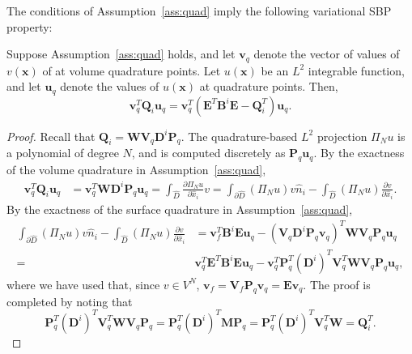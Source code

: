 \documentclass{svjour3}                     %
\renewcommand{\hat}{\widehat}
\newcommand{\pd}[2]{\frac{\partial#1}{\partial#2}}
\newcommand{\LRp}[1]{\left( #1 \right)}
\begin{document}

The conditions of Assumption~\ref{ass:quad} imply the following variational SBP property:
\begin{lemma}
\label{lemma:vsbp}
Suppose Assumption~\ref{ass:quad} holds, and let $\bm{v}_q$ denote the vector of values of $v(\bm{x})$ of at volume quadrature points. Let $u(\bm{x})$ be an $L^2$ integrable function, and let $\bm{u}_q$ denote the values of $u(\bm{x})$ at quadrature points.  Then, 
\[
\bm{v}_q^T\bm{Q}_i \bm{u}_q = \bm{v}_q^T\LRp{ {\bm{E}}^T \bm{B}^i\bm{E} - \bm{Q}_i^T}\bm{u}_q.
\]
\end{lemma}
\begin{proof}
Recall that $\bm{Q}_i = \bm{W} \bm{V}_q \bm{D}^i\bm{P}_q$.  The quadrature-based $L^2$ projection $\Pi_Nu$ is a polynomial of degree $N$, and is computed discretely as $\bm{P}_q\bm{u}_q$.  By the exactness of the volume quadrature in Assumption~\ref{ass:quad}, 
\begin{align*}
\bm{v}_q^T\bm{Q}_i \bm{u}_q &= \bm{v}_q^T\bm{W} \bm{D}^i \bm{P}_q \bm{u}_q = \int_{\hat{D}} \pd{\Pi_N u}{\hat{x}_i} v = \int_{\partial \hat{D}} (\Pi_N u) v \hat{n}_i - \int_{\hat{D}} \LRp{\Pi_N u} \pd{v}{\hat{x}_i}.
\end{align*}
By the exactness of the surface quadrature in Assumption~\ref{ass:quad}, 
\begin{align*}
\int_{\partial \hat{D}} (\Pi_N u) v \hat{n}_i -   \int_{\hat{D}} \LRp{\Pi_N u} \pd{v}{\hat{x}_i} &=\bm{v}_f^T\bm{B}^i \bm{E}\bm{u}_q - \LRp{\bm{V}_q\bm{D}^i\bm{P}_q\bm{v}_q}^T\bm{W} \bm{V}_q\bm{P}_q\bm{u}_q\\
=& \bm{v}_q^T {\bm{E}}^T\bm{B}^i \bm{E}\bm{u}_q - \bm{v}_q^T \bm{P}_q^T\LRp{\bm{D}^i}^T \bm{V}_q^T \bm{W} \bm{V}_q\bm{P}_q\bm{u}_q,
\end{align*}
where we have used that, since $v \in V^N$, $\bm{v}_f = \bm{V}_f\bm{P}_q\bm{v}_q = \bm{E}\bm{v}_q$.  The proof is completed by noting that 
\[
\bm{P}_q^T\LRp{\bm{D}^i}^T \bm{V}_q^T \bm{W} \bm{V}_q\bm{P}_q = \bm{P}_q^T\LRp{\bm{D}^i}^T \bm{M}\bm{P}_q = \bm{P}_q^T\LRp{\bm{D}^i}^T \bm{V}_q^T\bm{W} = \bm{Q}_i^T.
\]
\end{proof}
\end{document}
